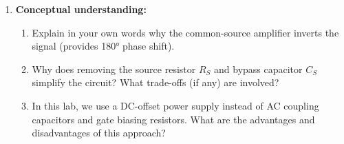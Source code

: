 \documentclass[10pt]{article}
\begin{document}
\begin{enumerate}
    \item \textbf{Conceptual understanding:}
    \begin{enumerate}
        \item Explain in your own words why the common-source amplifier inverts the signal (provides 180° phase shift).
        \item Why does removing the source resistor $R_S$ and bypass capacitor $C_S$ simplify the circuit? What trade-offs (if any) are involved?
        \item In this lab, we use a DC-offset power supply instead of AC coupling capacitors and gate biasing resistors. What are the advantages and disadvantages of this approach?
    \end{enumerate}
    
    
\end{enumerate}
\end{document}

